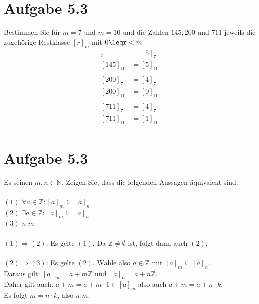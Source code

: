 \documentclass[11pt]{article}
\begin{document}
    \section[5.3]{Aufgabe 5.3}\label{sec:aufgabe-5.3}
    Bestimmen Sie für $m=7$ und $m=10$ und die Zahlen $145, 200$ und $711$ jeweils die zugehörige Restklasse $[r]_{m}$ mit $0\leqr<m$\\
    \begin{align*}
    [145]
        _7&=[5]_7\\
        [145]_{10}&=[5]_{10}\\
        \\
        [200]_7&=[4]_{7}\\
        [200]_{10}&=[0]_{10}\\
        \\
        [711]_7&=[4]_{7}\\
        [711]_{10}&=[1]_{10}\\
    \end{align*}
    \section[5.3]{Aufgabe 5.3}\label{sec:aufgabe-5.32}
    Es seinen $m,n\in \mathbb{N}$.
    Zeigen Sie, dass die folgenden Aussagen äquivalent sind:\\
    \\
    $(1)$ $\forall a\in\mathbb{Z}:[a]_m\subseteq[a]_n$.\\
    $(2)$ $\exists a\in\mathbb{Z}:[a]_m\subseteq[a]_n$.\\
    $(3)$ $n|m$\\
    \\
    $(1)\Rightarrow(2)$: Es gelte $(1)$.
    Da $\mathbb{Z}\neq\emptyset$ ist, folgt dann auch $(2)$.\\
    \\
    $(2)\Rightarrow(3)$: Es gelte $(2)$.
    Wähle also $a\in\mathbb{Z}$ mit $[a]_m\subseteq[a]_n$.\\
    Daraus gilt: $[a]_m=a+m\mathbb{Z}$ und $[a]_n=a+n\mathbb{Z}$.\\
    Daher gilt auch: $a+m=a+m\cdot1\in[a]_m$ also auch $a+m=a+n\cdot k$.\\
    Es folgt $m=n\cdot k$, also $n|m$.
\end{document}
